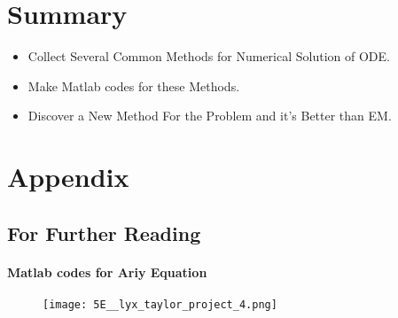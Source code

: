 \documentclass[english]{beamer}
\def\lyxframeend{} %
\begin{document}
\lyxframeend{}\section*{Summary}


\lyxframeend{}
\begin{itemize}
\item <1->Collect Several Common Methods for Numerical Solution of ODE.
\item <2->Make Matlab codes for these Methods.
\item <3->Discover a New Method For the Problem and it's Better than EM.
\end{itemize}

\lyxframeend{}

\appendix

\lyxframeend{}\section*{Appendix}


\lyxframeend{}\subsection*{For Further Reading}


\lyxframeend{}


\framesubtitle{Matlab codes for Ariy Equation}

\begin{figure}
\caption{\protect\texttt{[image: 5E\_\_lyx\_taylor\_project\_4.png]}}
\end{figure}



\lyxframeend{}
\end{document}
